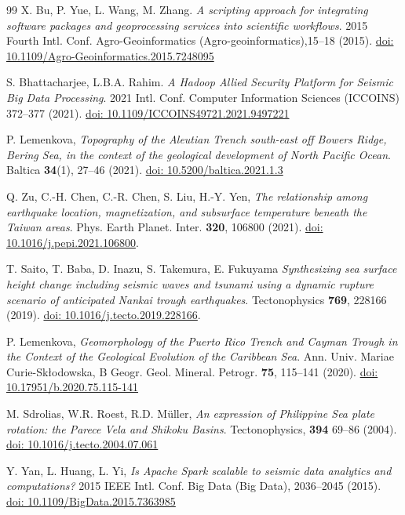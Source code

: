 \documentclass{rrparticle}
\begin{document}
\begin{thebibliography}{99}
 X. Bu, P. Yue, L. Wang, M. Zhang. \emph{A scripting approach for integrating software packages and geoprocessing services into scientific workflows}. 2015 Fourth Intl. Conf. Agro-Geoinformatics (Agro-geoinformatics),15--18 (2015). \href{https://doi.org/10.1109/Agro-Geoinformatics.2015.7248095}{doi: 10.1109/Agro-Geoinformatics.2015.7248095}

 S. Bhattacharjee, L.B.A. Rahim. \emph{A Hadoop Allied Security Platform for Seismic Big Data Processing}. 2021 Intl. Conf. Computer Information Sciences (ICCOINS) 372--377 (2021).  \href{https://doi.org/10.1109/ICCOINS49721.2021.9497221}{doi: 10.1109/ICCOINS49721.2021.9497221}

P. Lemenkova, \emph{Topography of the Aleutian Trench south-east off Bowers Ridge, Bering Sea, in the context of the geological development of North Pacific Ocean}. Baltica \textbf{34}(1), 27--46 (2021). \href{https://doi.org/10.5200/baltica.2021.1.3}{doi: 10.5200/baltica.2021.1.3}

 Q. Zu, C.-H. Chen, C.-R. Chen, S. Liu, H.-Y. Yen, \emph{The relationship among earthquake location, magnetization, and subsurface temperature beneath the Taiwan areas}. Phys. Earth Planet. Inter. \textbf{320}, 106800 (2021). \href{https://doi.org/10.1016/j.pepi.2021.106800}{doi: 10.1016/j.pepi.2021.106800}.

 T. Saito, T. Baba, D. Inazu, S. Takemura, E. Fukuyama \emph{Synthesizing sea surface height change including seismic waves and tsunami using a dynamic rupture scenario of anticipated Nankai trough earthquakes}. Tectonophysics \textbf{769}, 228166 (2019). \href{https://doi.org/10.1016/j.tecto.2019.228166}{doi: 10.1016/j.tecto.2019.228166}.

P. Lemenkova, \emph{Geomorphology of the Puerto Rico Trench and Cayman Trough in the Context of the Geological Evolution of the Caribbean Sea}. Ann. Univ. Mariae Curie-Skłodowska, B Geogr. Geol. Mineral. Petrogr. \textbf{75}, 115--141 (2020). \href{https://doi.org/10.17951/b.2020.75.115-141}{doi: 10.17951/b.2020.75.115-141}

 M. Sdrolias, W.R. Roest, R.D. Müller, \emph{An expression of Philippine Sea plate rotation: the Parece Vela and Shikoku Basins}. Tectonophysics, \textbf{394} 69--86 (2004). \href{https://doi.org/10.1016/j.tecto.2004.07.061}{doi: 10.1016/j.tecto.2004.07.061}

 Y. Yan, L. Huang, L. Yi,  \emph{Is Apache Spark scalable to seismic data analytics and computations?} 2015 IEEE Intl. Conf. Big Data (Big Data), 2036--2045 (2015).  \href{https://doi.org/10.1109/BigData.2015.7363985}{doi: 10.1109/BigData.2015.7363985}


\end{thebibliography}
\end{document}
